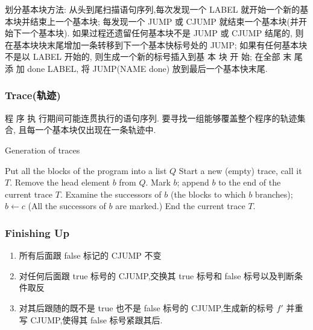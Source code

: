 划分基本块方法: 从头到尾扫描语句序列,每次发现一个 LABEL 就开始一个新的基本块并结束上一个基本块; 每发现一个 JUMP 或 CJUMP 就结束一个基本块(并开始下一个基本块). 如果过程还遗留任何基本块不是 JUMP 或 CJUMP 结尾的, 则在基本块块末尾增加一条转移到下一个基本快标号处的 JUMP; 如果有任何基本块不是以 LABEL 开始的, 则生成一个新的标号插入到基 本 块 开 始; 在全部 末 尾 添 加 done LABEL, 将 JUMP(NAME done) 放到最后一个基本快末尾.


\subsubsection{Trace(轨迹)}
程 序 执 行期间可能连贯执行的语句序列. 要寻找一组能够覆盖整个程序的轨迹集合, 且每一个基本块仅出现在一条轨迹中.
\begin{algorithm}[H]
    \caption{Generation of traces}
    \begin{algorithmic}
        \State Put all the blocks of the program into a list $Q$
            \State Start a new (empty) trace, call it $T$.
            \State Remove the head element $b$ from $Q$.
                \State Mark $b$; append $b$ to the end of the current trace $T$.
                \State Examine the successors of $b$ (the blocks to which $b$ branches);
                    \State $b \leftarrow c$
                \EndIf
            \EndWhile
            \State (All the successors of $b$ are marked.)
            \State End the current trace $T$.
        \EndWhile
    \end{algorithmic}
\end{algorithm}

\subsubsection{Finishing Up}
\begin{enumerate}
    \item 所有后面跟 false 标记的 CJUMP 不变
    \item 对任何后面跟 true 标号的 CJUMP,交换其 true 标号和 false 标号以及判断条件取反
    \item 对其后跟随的既不是 true 也不是 false 标号的 CJUMP,生成新的标号 $f'$ 并重写 CJUMP,使得其 false 标号紧跟其后.
\end{enumerate}

